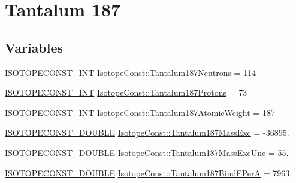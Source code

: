 \hypertarget{group___isotope_const-_tantalum-_ta187}{}\section{Tantalum 187}
\label{group___isotope_const-_tantalum-_ta187}
\subsection*{Variables}
\begin{DoxyCompactItemize}
\item 
\mbox{\hyperlink{group___isotope_const-_macros_ga5f18360b3e99483a35c32d789e62621c}{I\+S\+O\+T\+O\+P\+E\+C\+O\+N\+S\+T\+\_\+\+I\+NT}} \mbox{\hyperlink{group___isotope_const-_tantalum-_ta187_ga084c28b37da701fc8695f26b7510642e}{Isotope\+Const\+::\+Tantalum187\+Neutrons}} = 114
\item 
\mbox{\hyperlink{group___isotope_const-_macros_ga5f18360b3e99483a35c32d789e62621c}{I\+S\+O\+T\+O\+P\+E\+C\+O\+N\+S\+T\+\_\+\+I\+NT}} \mbox{\hyperlink{group___isotope_const-_tantalum-_ta187_ga09fdb03e29f194faecfbab89c93b6d3f}{Isotope\+Const\+::\+Tantalum187\+Protons}} = 73
\item 
\mbox{\hyperlink{group___isotope_const-_macros_ga5f18360b3e99483a35c32d789e62621c}{I\+S\+O\+T\+O\+P\+E\+C\+O\+N\+S\+T\+\_\+\+I\+NT}} \mbox{\hyperlink{group___isotope_const-_tantalum-_ta187_gaa59e99a60dbab2a136d4f8282380408a}{Isotope\+Const\+::\+Tantalum187\+Atomic\+Weight}} = 187
\item 
\mbox{\hyperlink{group___isotope_const-_macros_ga8f45a7272ce02c0b4c65c44636ed719a}{I\+S\+O\+T\+O\+P\+E\+C\+O\+N\+S\+T\+\_\+\+D\+O\+U\+B\+LE}} \mbox{\hyperlink{group___isotope_const-_tantalum-_ta187_ga1f2c0406e00ca56d5aa1561ccfdbf941}{Isotope\+Const\+::\+Tantalum187\+Mass\+Exc}} = -\/36895.
\item 
\mbox{\hyperlink{group___isotope_const-_macros_ga8f45a7272ce02c0b4c65c44636ed719a}{I\+S\+O\+T\+O\+P\+E\+C\+O\+N\+S\+T\+\_\+\+D\+O\+U\+B\+LE}} \mbox{\hyperlink{group___isotope_const-_tantalum-_ta187_gaf5a05c58e3a3fbe9ffeccf6bd778fa70}{Isotope\+Const\+::\+Tantalum187\+Mass\+Exc\+Unc}} = 55.
\item 
\mbox{\hyperlink{group___isotope_const-_macros_ga8f45a7272ce02c0b4c65c44636ed719a}{I\+S\+O\+T\+O\+P\+E\+C\+O\+N\+S\+T\+\_\+\+D\+O\+U\+B\+LE}} \mbox{\hyperlink{group___isotope_const-_tantalum-_ta187_ga6aa855e9b2ba2453f78a7d5645b9631e}{Isotope\+Const\+::\+Tantalum187\+Bind\+E\+PerA}} = 7963.
\item 

\end{DoxyCompactItemize}
